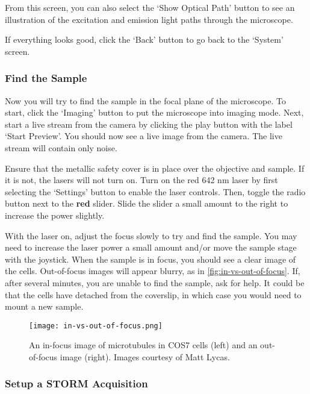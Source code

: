 \documentclass[10pt,a4paper,oneside]{book}
\begin{document}
From this screen, you can also select the `Show Optical Path' button to see an illustration of the excitation and emission light paths through the microscope.

If everything looks good, click the `Back' button to go back to the `System' screen.

\subsubsection{Find the Sample}

\newline

Now you will try to find the sample in the focal plane of the microscope. To start, click the `Imaging' button to put the microscope into imaging mode. Next, start a live stream from the camera by clicking the play button with the label `Start Preview'. You should now see a live image from the camera. The live stream will contain only noise.

Ensure that the metallic safety cover is in place over the objective and sample. If it is not, the lasers will not turn on. Turn on the red 642 nm laser by first selecting the `Settings' button to enable the laser controls. Then, toggle the radio button next to the \textbf{red} slider. Slide the slider a small amount to the right to increase the power slightly.

With the laser on, adjust the focus slowly to try and find the sample. You may need to increase the laser power a small amount and/or move the sample stage with the joystick. When the sample is in focus, you should see a clear image of the cells. Out-of-focus images will appear blurry, as in \autoref{fig:in-vs-out-of-focus}. If, after several minutes, you are unable to find the sample, ask for help. It could be that the cells have detached from the coverslip, in which case you would need to mount a new sample.

\begin{figure}[ht]
    \centering
    \texttt{[image: in-vs-out-of-focus.png]}
    \caption{An in-focus image of microtubules in COS7 cells (left) and an out-of-focus image (right). Images courtesy of Matt Lycas.}
    \label{fig:in-vs-out-of-focus}
\end{figure}

\subsubsection{Setup a STORM Acquisition}
\end{document}
